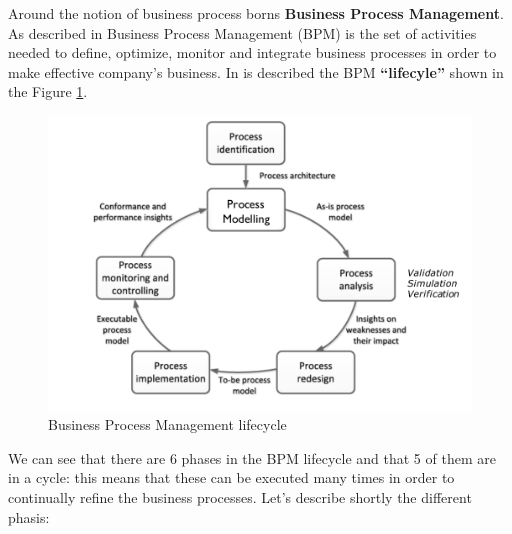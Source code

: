 Around the notion of business process borns \textbf{Business Process Management}. As described in 
\cite{DBLP:books/sp/DumasRMR18} Business Process Management (BPM) is the set of activities needed to define, optimize, monitor 
and integrate business processes in order to make effective company's business. In \cite{DBLP:books/WeskeBPM} is described the 
BPM \textbf{``lifecyle''} shown in the Figure \ref{images:bpm_lifecycle}.

\begin{figure}[!ht]
    \centering
\includegraphics[width=\textwidth]{images/bpm_lifecycle.png}
    \caption{Business Process Management lifecycle \cite{DBLP:books/sp/DumasRMR18}}
    \label{images:bpm_lifecycle}
\end{figure}

We can see that there are 6 phases in the BPM lifecycle and that 5 of them are in a cycle: this means that these can 
be executed many times in order to continually refine the business processes. Let's describe shortly the different 
phasis:

